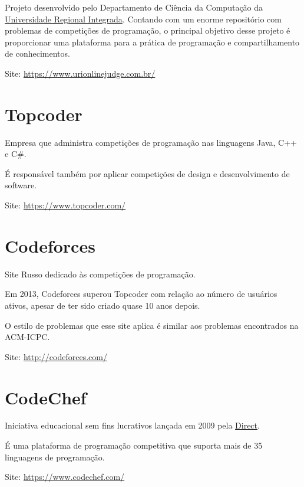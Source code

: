 Projeto desenvolvido pelo Departamento de Ciência da Computação da \href{http://www.uri.br/}{Universidade Regional Integrada}.
Contando com um enorme repositório com problemas de competições de programação, o principal objetivo desse projeto é proporcionar uma 
plataforma para a prática de programação e compartilhamento de conhecimentos.

Site: \href{https://www.urionlinejudge.com.br/}{https://www.urionlinejudge.com.br/}

\section{Topcoder} 

Empresa que administra competições de programação nas linguagens Java, C++ e C$\#$.

É responsável também por aplicar competições de design e desenvolvimento de software.

Site: \href{https://www.topcoder.com/}{https://www.topcoder.com/}

\section{Codeforces}

Site Russo dedicado às competições de programação. 

Em 2013, Codeforces superou Topcoder com relação ao número de usuários ativos, apesar de ter sido criado quase 10 anos depois.

O estilo de problemas que esse site aplica é similar aos problemas encontrados na ACM-ICPC.

Site: \href{http://codeforces.com/}{http://codeforces.com/}

\section{CodeChef}

Iniciativa educacional sem fins lucrativos lançada em 2009 pela \href{http://www.directi.com/}{Direct}.

É uma plataforma de programação competitiva que suporta mais de 35 linguagens de programação.

Site: \href{https://www.codechef.com/}{https://www.codechef.com/}


